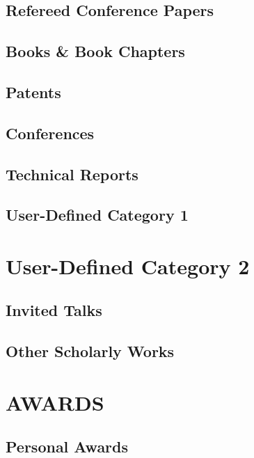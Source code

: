 \documentclass[10pt]{article}
\begin{document}
\subsection{Refereed Conference Papers}


\subsection{Books \& Book Chapters}


\subsection{Patents}


\subsection{Conferences}


\subsection{Technical Reports}


\subsection{User-Defined Category 1}


\section{User-Defined Category 2}


\subsection{Invited Talks}


\subsection{Other Scholarly Works}

\section{AWARDS}
\subsection{Personal Awards}

\end{document}
